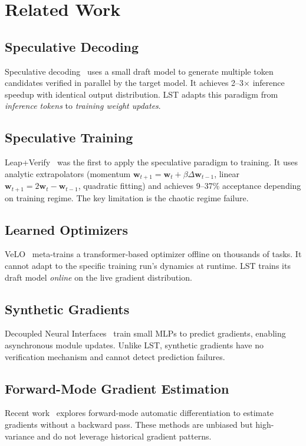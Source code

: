 \documentclass[conference]{IEEEtran}
\begin{document}
\section{Related Work}

\subsection{Speculative Decoding}
Speculative decoding~\cite{leviathan2023fast, chen2023accelerating, stern2018blockwise} uses a small draft model to generate multiple token candidates verified in parallel by the target model. It achieves 2--3$\times$ inference speedup with identical output distribution. LST adapts this paradigm from \emph{inference tokens} to \emph{training weight updates}.

\subsection{Speculative Training}
Leap+Verify~\cite{leapverify2026} was the first to apply the speculative paradigm to training. It uses analytic extrapolators (momentum $\mathbf{w}_{t+1} = \mathbf{w}_t + \beta \Delta\mathbf{w}_{t-1}$, linear $\mathbf{w}_{t+1} = 2\mathbf{w}_t - \mathbf{w}_{t-1}$, quadratic fitting) and achieves 9--37\% acceptance depending on training regime. The key limitation is the chaotic regime failure.

\subsection{Learned Optimizers}
VeLO~\cite{metz2022velo} meta-trains a transformer-based optimizer offline on thousands of tasks. It cannot adapt to the specific training run's dynamics at runtime. LST trains its draft model \emph{online} on the live gradient distribution.

\subsection{Synthetic Gradients}
Decoupled Neural Interfaces~\cite{jaderberg2017decoupled} train small MLPs to predict gradients, enabling asynchronous module updates. Unlike LST, synthetic gradients have no verification mechanism and cannot detect prediction failures.

\subsection{Forward-Mode Gradient Estimation}
Recent work~\cite{baydin2022gradients, silver2025fwdgrad} explores forward-mode automatic differentiation to estimate gradients without a backward pass. These methods are unbiased but high-variance and do not leverage historical gradient patterns.
\end{document}
